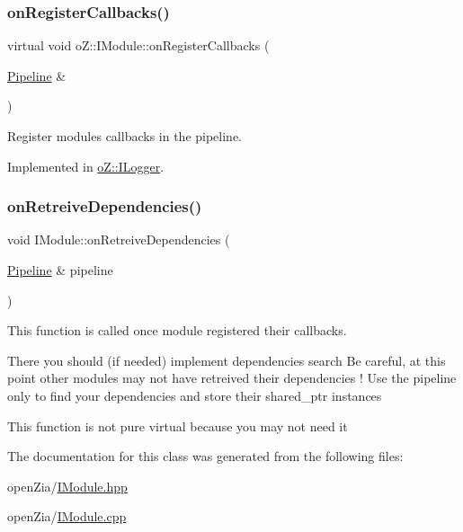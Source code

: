 \subsubsection{\texorpdfstring{onRegisterCallbacks()}{onRegisterCallbacks()}}
{\footnotesize\ttfamily virtual void o\+Z\+::\+I\+Module\+::on\+Register\+Callbacks (\begin{DoxyParamCaption}\item[{\mbox{\hyperlink{classo_z_1_1_pipeline}{Pipeline}} \&}]{ }\end{DoxyParamCaption})\hspace{0.3cm}{\ttfamily [pure virtual]}}



Register module\textquotesingle{}s callbacks in the pipeline. 



Implemented in \mbox{\hyperlink{classo_z_1_1_i_logger_a10732b6da6e8f085c6fe5fa154d361ef}{o\+Z\+::\+I\+Logger}}.

\mbox{\label{classo_z_1_1_i_module_af183d3711ef7d7a6966ac078b63a7685}} 
\subsubsection{\texorpdfstring{onRetreiveDependencies()}{onRetrieveDependencies()}}
{\footnotesize\ttfamily void I\+Module\+::on\+Retreive\+Dependencies (\begin{DoxyParamCaption}\item[{\mbox{\hyperlink{classo_z_1_1_pipeline}{Pipeline}} \&}]{pipeline }\end{DoxyParamCaption})\hspace{0.3cm}{\ttfamily [virtual]}}



This function is called once module registered their callbacks. 

There you should (if needed) implement dependencies search Be careful, at this point other modules may not have retreived their dependencies ! Use the pipeline only to find your dependencies and store their shared\+\_\+ptr instances

This function is not pure virtual because you may not need it 

The documentation for this class was generated from the following files\+:\begin{DoxyCompactItemize}
\item 
open\+Zia/\mbox{\hyperlink{_i_module_8hpp}{I\+Module.\+hpp}}\item 
open\+Zia/\mbox{\hyperlink{_i_module_8cpp}{I\+Module.\+cpp}}\end{DoxyCompactItemize}
